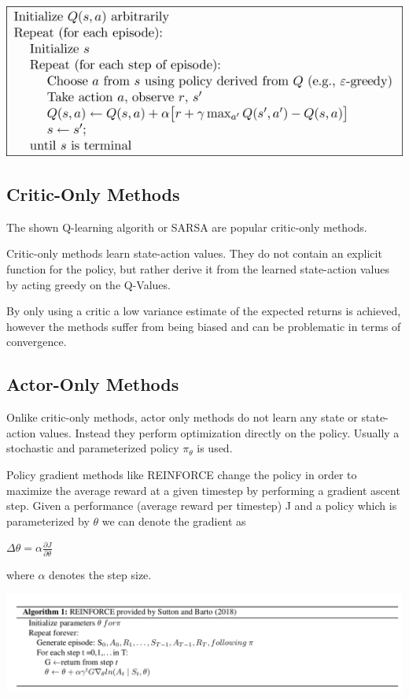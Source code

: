 \includegraphics[scale=0.5]{bilder/qlearning2.png}
\pagebreak
\subsection{Critic-Only Methods}

The shown Q-learning algorith or SARSA are popular critic-only methods.

Critic-only methods learn state-action values. They do not contain an explicit function for the policy, but rather derive it from the learned state-action values by acting greedy on the Q-Values.

By only using a critic a low variance estimate of the expected returns is achieved, however the methods suffer from being biased and can be problematic in terms of convergence.

\subsection{Actor-Only Methods}

Onlike critic-only methods, actor only methods do not learn any state or state-action values.
Instead they perform optimization directly on the policy.
Usually a stochastic and parameterized policy $\pi_\theta$ is used.

Policy gradient methods like REINFORCE change the policy in order to maximize the average reward at a given timestep by performing a gradient ascent step. \citep{Williams1992}
Given a performance (average reward per timestep) J and a policy which is parameterized by $\theta$ we can denote the gradient as
\begin{center}
$\Delta \theta = \alpha \frac{\partial J}{\partial  \theta}$
\end{center}

where $\alpha$ denotes the step size.


\includegraphics[scale=0.4]{bilder/REINFORCE.png}

